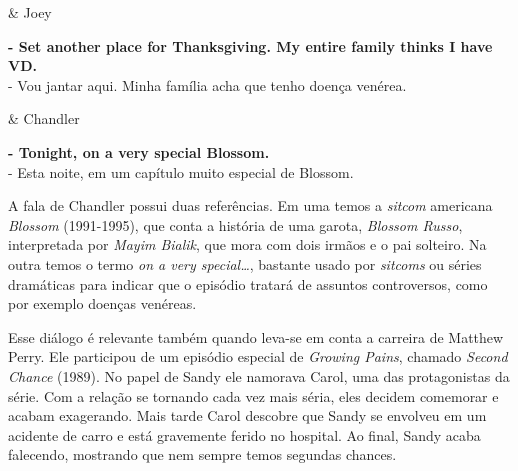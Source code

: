 \begin{tcolorbox}[enhanced,center upper,
    drop fuzzy shadow southeast, boxrule=0.3pt,
    lower separated=false,
    colframe=black!30!dialogoBorder,colback=white]
\begin{minipage}[c]{0.14\linewidth}
   & \centering \scriptsize{Joey}
\end{minipage}
\hspace{.1mm}
\begin{minipage}[c]{0.8\linewidth}
  \textbf{- Set another place for Thanksgiving. My entire family thinks I have VD.}\\
  - Vou jantar aqui. Minha família acha que tenho doença venérea.
\end{minipage}

\medskip
\begin{minipage}[c]{0.14\linewidth}
   & \centering \scriptsize{Chandler}
\end{minipage}
\hspace{.1mm}
\begin{minipage}[c]{0.8\linewidth}
  \textbf{- Tonight, on a very special Blossom.}\\
  - Esta noite, em um capítulo muito especial de Blossom.
\end{minipage}
\end{tcolorbox}

A fala de Chandler possui duas referências. Em uma temos a \emph{sitcom}
americana \emph{Blossom} (1991-1995), que conta a história de uma
garota, \emph{Blossom Russo}, interpretada por \emph{Mayim Bialik}, que
mora com dois irmãos e o pai solteiro. Na outra temos o termo \emph{on a
very special\ldots{}}, bastante usado por \emph{sitcoms} ou séries
dramáticas para indicar que o episódio tratará de assuntos controversos,
como por exemplo doenças venéreas.

Esse diálogo é relevante também quando leva-se em conta a carreira de
Matthew Perry. Ele participou de um episódio especial de \emph{Growing
Pains}, chamado \emph{Second Chance} (1989). No papel de Sandy ele
namorava Carol, uma das protagonistas da série. Com a relação se
tornando cada vez mais séria, eles decidem comemorar e acabam
exagerando. Mais tarde Carol descobre que Sandy se envolveu em um
acidente de carro e está gravemente ferido no hospital. Ao final, Sandy
acaba falecendo, mostrando que nem sempre temos segundas chances.

